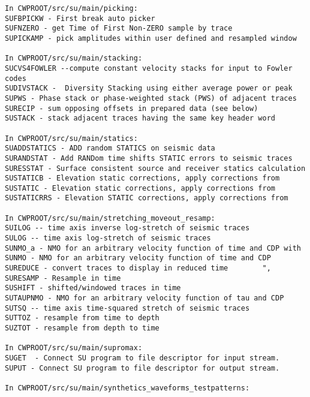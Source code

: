 {\begin{verbatim}
In CWPROOT/src/su/main/picking:
SUFBPICKW - First break auto picker				
SUFNZERO - get Time of First Non-ZERO sample by trace              
SUPICKAMP - pick amplitudes within user defined and resampled window	

In CWPROOT/src/su/main/stacking:
SUCVS4FOWLER --compute constant velocity stacks for input to Fowler codes
SUDIVSTACK -  Diversity Stacking using either average power or peak   
SUPWS - Phase stack or phase-weighted stack (PWS) of adjacent traces	
SURECIP - sum opposing offsets in prepared data (see below)	
SUSTACK - stack adjacent traces having the same key header word

In CWPROOT/src/su/main/statics:
SUADDSTATICS - ADD random STATICS on seismic data			
SURANDSTAT - Add RANDom time shifts STATIC errors to seismic traces	
SURESSTAT - Surface consistent source and receiver statics calculation
SUSTATICB - Elevation static corrections, apply corrections from	
SUSTATIC - Elevation static corrections, apply corrections from	
SUSTATICRRS - Elevation STATIC corrections, apply corrections from	

In CWPROOT/src/su/main/stretching_moveout_resamp:
SUILOG -- time axis inverse log-stretch of seismic traces	
SULOG -- time axis log-stretch of seismic traces		
SUNMO_a - NMO for an arbitrary velocity function of time and CDP with	     
SUNMO - NMO for an arbitrary velocity function of time and CDP	     
SUREDUCE - convert traces to display in reduced time		", 
SURESAMP - Resample in time                                       
SUSHIFT - shifted/windowed traces in time				
SUTAUPNMO - NMO for an arbitrary velocity function of tau and CDP	
SUTSQ -- time axis time-squared stretch of seismic traces	
SUTTOZ - resample from time to depth					
SUZTOT - resample from depth to time					

In CWPROOT/src/su/main/supromax:
SUGET  - Connect SU program to file descriptor for input stream.	
SUPUT - Connect SU program to file descriptor for output stream.	

In CWPROOT/src/su/main/synthetics_waveforms_testpatterns:


\end{verbatim}}
